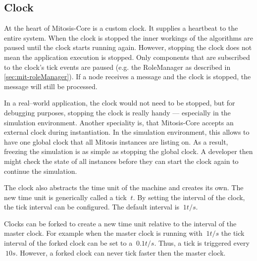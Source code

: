 \subsection{Clock}\label{sec:mit-clock}
At the heart of Mitosis-Core is a custom clock. It supplies a heartbeat to the entire system. When the clock is stopped the inner workings of the algorithms are paused until the clock starts running again. However, stopping the clock does not mean the application execution is stopped. Only components that are subscribed to the clock's tick events are paused (e.g. the RoleManager as described in \vref{sec:mit-roleManager}). If a node receives a message and the clock is stopped, the message will still be processed.

In a real–world application, the clock would not need to be stopped, but for debugging purposes, stopping the clock is really handy — especially in the simulation environment. Another speciality is, that Mitosis-Core accepts an external clock during instantiation. In the simulation environment, this allows to have one global clock that all Mitosis instances are listing on. 
As a result, freezing the simulation is as simple as stopping the global clock. A developer then might check the state of all instances before they can start the clock again to continue the simulation.

The clock also abstracts the time unit of the machine and creates its own. The new time unit is generically called a tick $\ t $. By setting the interval of the clock, the tick interval can be configured. The default interval is $\ 1t/s $.

Clocks can be forked to create a new time unit relative to the interval of the master clock. For example when the master clock is running with $\ 1t/s $ the tick interval of the forked clock can be set to a $\ 0.1t/s $. Thus, a tick is triggered every $\ 10s $. However, a forked clock can never tick faster then the master clock.
